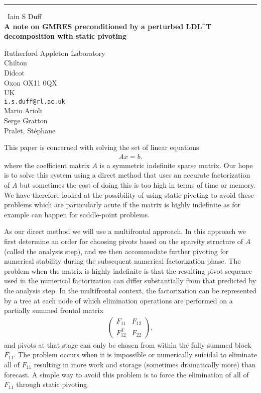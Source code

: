 \documentclass{report}
\begin{document}
\begin{center}
\rule{6in}{1pt} \
{\large Iain S Duff \\
{\bf A note on GMRES preconditioned by a perturbed LDL^T decomposition with static pivoting}}

Rutherford Appleton Laboratory \\ Chilton \\ Didcot \\ Oxon OX11 0QX \\ UK
\\
{\tt i.s.duff@rl.ac.uk}\\
Mario Arioli\\
Serge Gratton\\
	Pralet,  St\'ephane\end{center}

This paper is concerned with solving the set of linear equations
\begin{eqnarray}\label{Ax=b}
A x = b.
\end{eqnarray}
where the coefficient matrix $A$ is a symmetric indefinite sparse matrix.
Our hope is to solve this system using a direct method that uses an
accurate factorization of $A$ but sometimes the
cost of doing this is too high in terms of time or memory. We have therefore
looked
at the possibility of using static pivoting to avoid these problems which
are particularly acute if the matrix is highly indefinite as for example can
happen for saddle-point problems.

As our direct method we will use a multifrontal approach. In this approach
we first determine an order for choosing pivots based on the sparsity
structure of $A$ (called the analysis step), and we then accommodate further
pivoting for numerical
stability during the subsequent numerical factorization phase. The problem
when the matrix is highly indefinite is that the resulting pivot sequence
used in the numerical factorization can differ substantially from that
predicted by the analysis step. In the multifrontal context, the
factorization can be represented by a tree at each node of which elimination
operations are performed on a partially summed frontal matrix
\begin{eqnarray}\label{multifrontal}
\left ( {\begin{array} {ll} F_{11} & F_{12} \\ F_{12}^T & F_{22} \end{array}}
\right ),
\end{eqnarray}
and pivots at that stage can only be chosen from within the fully summed block
$F_{11}$. The problem occurs when it is impossible or numerically suicidal
to eliminate all of $F_{11}$ resulting in more work and storage (sometimes
dramatically more) than forecast. A simple way to avoid this problem
is to force the elimination of all of $F_{11}$ through static pivoting.
\end{document}
